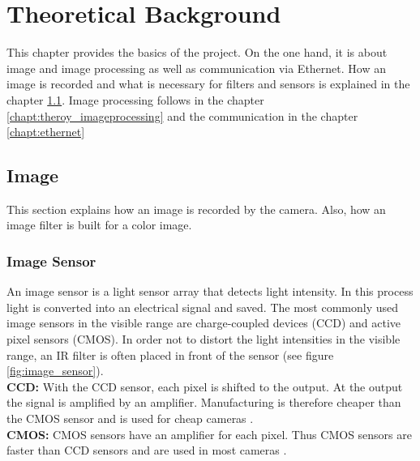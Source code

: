 %
%
\chapter{Theoretical Background} \label{chapt:theoreticalback}
This chapter provides the basics of the project. On the one hand, it is about image and image processing as well as communication via Ethernet. How an image is recorded and what is necessary for filters and sensors is explained in the chapter \ref{chapt:imag}. Image processing follows in the chapter \ref{chapt:theroy_imageprocessing} and the communication in the chapter \ref{chapt:ethernet}

%
%
\section{Image} \label{chapt:imag}
This section explains how an image is recorded by the camera. Also, how an image filter is built for a color image.

\subsection{Image Sensor}
An image sensor is a light sensor array that detects light intensity.
In this process light is converted into an electrical signal and saved. The most commonly used image sensors in the visible range are charge-coupled devices (CCD) and active pixel sensors (CMOS). In order not to distort the light intensities in the visible range, an IR filter is often placed in front of the sensor (see figure \ref{fig:image_sensor}).
\\

\textbf{CCD:} With the CCD sensor, each pixel is shifted to the output. At the output the signal is amplified by an amplifier. Manufacturing is therefore cheaper than the CMOS sensor and is used for cheap cameras \cite{ccd_cmos}.
\\

\textbf{CMOS:} CMOS sensors have an amplifier for each pixel. Thus CMOS sensors are faster than CCD sensors and are used in most cameras \cite{ccd_cmos}.

